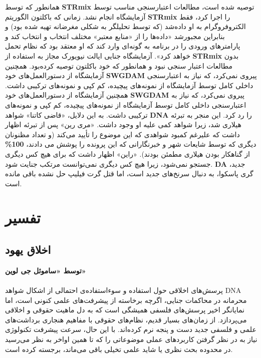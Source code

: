 همانطور که توسط \textenglish{\textbf{STRmix}} توصیه شده است، مطالعات اعتبارسنجی مناسب توسط آزمایشگاه انجام نشد.
زمانی که باکلتون الگوریتم \textenglish{\textbf{STRmix}} را اجرا کرد، فقط الکتروفروگرام به او داده‌شد (که توسط تحلیلگر به شکلی مغرضانه تهیه شده بود) و بنابراین مجبور‌شد «داده‌ها را از «منابع معتبر» مختلف انتخاب و انتخاب کند و پارامترهای ورودی را در برنامه به گونه‌ای وارد کند که او معتقد بود که نظام تحمل خواهد کرد».
آزمایشگاه جنایی ایالت نیویورک مجاز به استفاده از \textenglish{\textbf{STRmix}} بدون مطالعات اعتبار سنجی نبود و همانطور که خود باکلتون توصیه کرده‌بود.
همچنین آزمایشگاه از دستورالعمل‌های خود \textenglish{\textbf{SWGDAM}} پیروی نمی‌کرد، که نیاز به اعتبارسنجی داخلی کامل توسط آزمایشگاه از نمونه‌های پیچیده، کم کپی و نمونه‌های ترکیبی داشت.
همچنین آزمایشگاه از دستورالعمل‌های خود \textenglish{\textbf{SWGDAM}} پیروی نمی‌کرد، که نیاز به اعتبارسنجی داخلی کامل توسط آزمایشگاه از نمونه‌های پیچیده، کم کپی و نمونه‌های ترکیبی داشت.
به این دلایل، «قاضی کاتنا» شواهد \textenglish{\textbf{DNA}} را رد کرد.
این منجر به تبرئه هیلاری شد، زیرا شواهد کمی علیه او وجود داشت.
«مری رین» پس از تبرئه اظهار داشت که علیرغم کمبود شواهدی که این موضوع را تأیید می‌کند (و تعداد مظنونان دیگری که توسط شایعات شهر و خبرنگارانی که این پرونده را پوشش می دادند، \textenglish{\textbf{100\%}} از گناهکار بودن هیلاری مطمئن بودند).
«راین» اظهار داشت که برای هیچ کس دیگری جستجو نمی‌شود، زیرا هیچ کس دیگری نمی‌توانست مرتکب جنایت شود.
\textenglish{\textbf{DA}} جدید، گری پاسکوا، به دنبال سرنخ‌های جدید است، اما قتل گرت فیلیپ حل نشده باقی مانده است.
\newline
\newline


{
\section*{تفسیر}
\label{sec:تفسیر}

\subsection*{اخلاق یهود}
\label{subsec:اخلاق یهود}
\textbf{توسط «ساموئل جی لوین»}
\\\\
پرسش‌های اخلاقی حول استفاده و سوء‌استفاده‌ی احتمالی از اشکال شواهد DNA محرمانه در محاکمات جنایی، اگرچه برخاسته از پیشرفت‌های علمی کنونی است، اما نمایانگر اخیر پرسش‌های فلسفی همیشگی است که به دل ماهیت حقوقی و اخلاقی می‌پردازد.
از زمان‌های بسیار قدیم، نظام‌های حقوقی با مفاهیم هنجاری برداشت‌های علمی و فلسفی جدید دست و پنجه نرم کرده‌اند.
با این حال، سرعت پیشرفت تکنولوژی نیاز به در نظر گرفتن کاربردهای عملی موضوعاتی را که تا همین اواخر به نظر می‌رسید در محدوده بحث نظری یا شاید علمی تخیلی باقی می‌ماند، برجسته کرده است.
}


